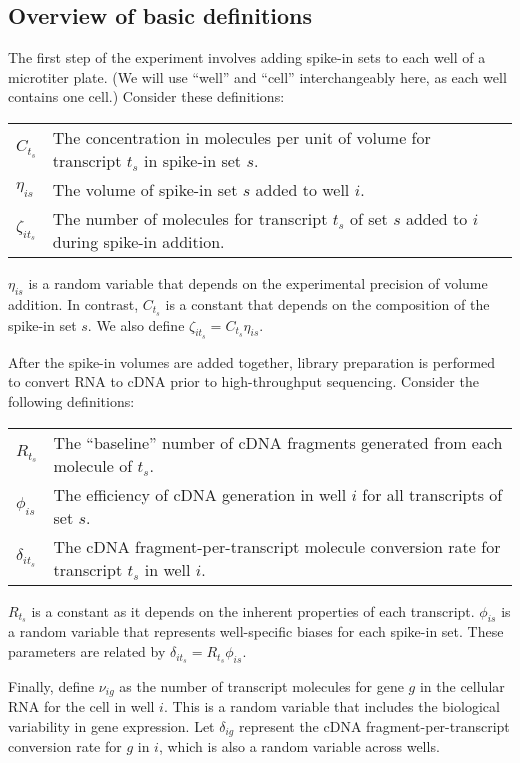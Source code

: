 \documentclass{article}
\begin{document}
\subsection{Overview of basic definitions}
The first step of the experiment involves adding spike-in sets to each well of a microtiter plate.
(We will use ``well'' and ``cell'' interchangeably here, as each well contains one cell.)
Consider these definitions:
\begin{center}
    \begin{tabular}{l p{}}
$C_{t_s}$  & The concentration in molecules per unit of volume for transcript $t_s$ in spike-in set $s$. \\
$\eta_{is}$   & The volume of spike-in set $s$ added to well $i$. \\
$\zeta_{it_s}$ & The number of molecules for transcript $t_s$ of set $s$ added to $i$ during spike-in addition.
\end{tabular}
\end{center}
$\eta_{is}$ is a random variable that depends on the experimental precision of volume addition.
In contrast, $C_{t_s}$ is a constant that depends on the composition of the spike-in set $s$.
We also define $\zeta_{it_s} = C_{t_s}\eta_{is}$.

After the spike-in volumes are added together, library preparation is performed to convert RNA to cDNA prior to high-throughput sequencing.
Consider the following definitions:
\begin{center}
\begin{tabular}{l p{}}
$R_{t_s}$ & The ``baseline'' number of cDNA fragments generated from each molecule of $t_s$. \\
$\phi_{is}$ & The efficiency of cDNA generation in well $i$ for all transcripts of set $s$. \\
$\delta_{it_s}$ & The cDNA fragment-per-transcript molecule conversion rate for transcript $t_s$ in well $i$.
\end{tabular}
\end{center}
$R_{t_s}$ is a constant as it depends on the inherent properties of each transcript.
$\phi_{is}$ is a random variable that represents well-specific biases for each spike-in set.
These parameters are related by $\delta_{it_s} = R_{t_s} \phi_{is}$.

Finally, define $\nu_{ig}$ as the number of transcript molecules for gene $g$ in the cellular RNA for the cell in well $i$.
This is a random variable that includes the biological variability in gene expression.
Let $\delta_{ig}$ represent the cDNA fragment-per-transcript conversion rate for $g$ in $i$, which is also a random variable across wells.
\end{document}
